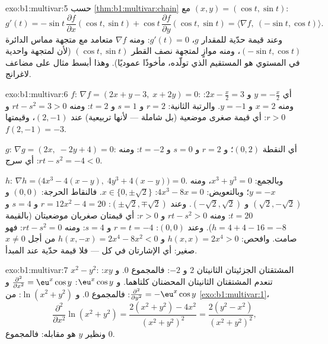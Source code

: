 \begin{solution}{exo:b1:multivar:5}
حسب \cref{thm:b1:multivar:chain} مع $(x, y) = (\cos t, \sin t)$:
\[
g'(t) = -\sin t\,\frac{\partial f}{\partial x}(\cos t, \sin t)
+ \cos t\,\frac{\partial f}{\partial y}(\cos t, \sin t)
= \bigl\langle \nabla f,\ (-\sin t, \cos t)\bigr\rangle .
\]
وعند قيمة حدّية للمقدار $g$، $g'(t) = 0$: ومنه  $\nabla f$ متعامد مع
متجهة مماس الدائرة $(-\sin t, \cos t)$، ومنه موازٍ
لمتجهة نصف القطر $(\cos t, \sin t)$ (لأن 
لمتجهة واحدية في المستوي هو المستقيم الذي تولّده، مأخوذًا
عموديًا). وهذا أبسط مثال على مضاعف
لاغرانج.
\end{solution}

\begin{solution}{exo:b1:multivar:6}
$f$: $\nabla f = (2x + y - 3,\; x + 2y) = 0$: أي $y = -\frac x2$ و
$2x - \frac x2 = 3$: ومنه $x = 2$ و $y = -1$. والرتبة الثانية: $r = 2$ و $s =
1$ و $t = 2$: ومنه $rt - s^2 = 3 > 0$ و $r > 0$: أي قيمة صغرى موضعية (بل شاملة ---
لأنها تربيعية) عند $(2, -1)$، وقيمتها $f(2,-1) = -3$.

$g$: $\nabla g = (2x,\; -2y + 4) = 0$: أي النقطة $(0, 2)$؛ و $r = 2$ و $s
= 0$ و $t = -2$: ومنه $rt - s^2 = -4 < 0$: أي سرج.

$h$: $\nabla h = \bigl(4x^3 - 4(x - y),\; 4y^3 + 4(x-y)\bigr) = 0$.
وبالجمع: $x^3 + y^3 = 0$، ومنه $y = -x$؛ وبالتعويض: $4x^3 - 8x = 0$:
$x \in \{0, \pm\sqrt2\}$. فالنقاط الحرجة: $(0,0)$ و
$(\sqrt2, -\sqrt2)$ و $(-\sqrt2, \sqrt2)$.
وعند $(\pm\sqrt2, \mp\sqrt2)$: $r = 12x^2 - 4 = 20$ و $s = 4$ و $t =
20$: ومنه $rt - s^2 > 0$ و $r > 0$: أي قيمتان صغريان موضعيتان (بالقيمة $h = 4 + 4 - 16 =
-8$). وعند $(0,0)$: $r = t = -4$ و $s = 4$: ومنه $rt - s^2 = 0$: فهو صامت.
وافحص: $h(x, x) = 2x^4 > 0$ و $h(x, -x) = 2x^4 - 8x^2 < 0$ من أجل
$x \neq 0$ صغير: أي الإشارتان في كل  --- فلا قيمة حدّية
عند المبدأ.
\end{solution}

\begin{solution}{exo:b1:multivar:7}
$x^2 - y^2$: المشتقتان الجزئيتان الثانيتان $2$ و $-2$: فالمجموع $0$. و $xy$: تنعدم
المشتقتان الثانيتان المحضتان كلتاهما. و $\eu^x\cos y$: $\frac{\partial^2}{\partial
x^2} = \eu^x\cos y$ و $\frac{\partial^2}{\partial y^2} =
-\eu^x\cos y$: فالمجموع $0$. و $\ln(x^2+y^2)$: من
\cref{exo:b1:multivar:1}،
\[
\frac{\partial^2}{\partial x^2}\ln(x^2+y^2)
= \frac{2(x^2+y^2) - 4x^2}{(x^2+y^2)^2}
= \frac{2(y^2 - x^2)}{(x^2+y^2)^2},
\]
ونظير $y$ هو مقابله: فالمجموع $0$.
\end{solution}


